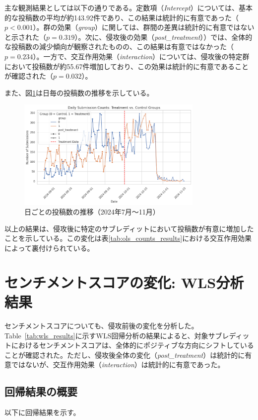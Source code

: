 \documentclass[11pt, a4j]{jreport}
\begin{document}
    主な観測結果としては以下の通りである。定数項（\textit{Intercept}）については、基本的な投稿数の平均が約143.92件であり、この結果は統計的に有意であった（$p < 0.001$）。群の効果（\textit{group}）に関しては、群間の差異は統計的に有意ではないと示された（$p = 0.319$）。次に、侵攻後の効果（\textit{post\_treatment}））では、全体的な投稿数の減少傾向が観察されたものの、この結果は有意ではなかった（$p = 0.234$）。一方で、交互作用効果（\textit{interaction}）については、侵攻後の特定群において投稿数が約55.67件増加しており、この効果は統計的に有意であることが確認された（$p = 0.032$）。

    また、図\ref{fig:submissions_comments_trends}は日毎の投稿数の推移を示している。
    \begin{figure}[H]
        \centering
        \includegraphics[width=0.8\textwidth]{submission_count_plot.png}
        \caption{日ごとの投稿数の推移（2024年7月～11月）}
        \label{fig:submissions_comments_trends}
    \end{figure}

    以上の結果は、侵攻後に特定のサブレディットにおいて投稿数が有意に増加したことを示している。この変化は表\ref{tab:ols_counts_results}における交互作用効果によって裏付けられている。

    \section{センチメントスコアの変化: WLS分析結果}
    センチメントスコアについても、侵攻前後の変化を分析した。Table~\ref{tab:wls_results}に示すWLS回帰分析の結果によると、対象サブレディットにおけるセンチメントスコアは、全体的にポジティブな方向にシフトしていることが確認された。ただし、侵攻後全体の変化（\textit{post\_treatment}）は統計的に有意ではないが、交互作用効果（\textit{interaction}）は統計的に有意であった。

    \subsection*{回帰結果の概要}
    以下に回帰結果を示す。
\end{document}
